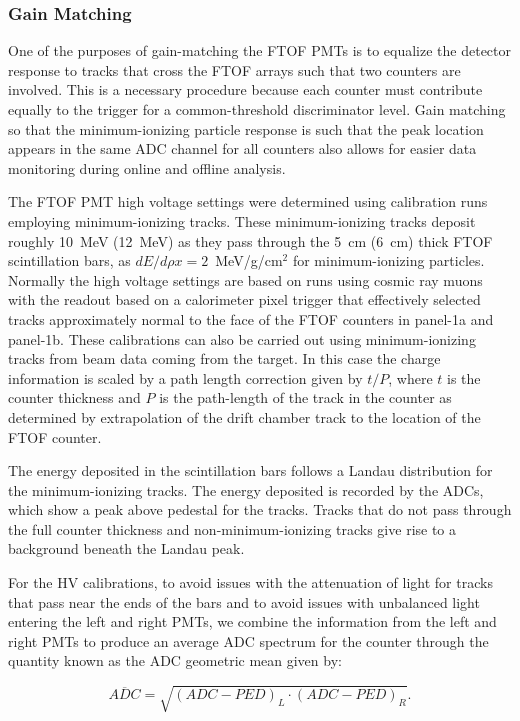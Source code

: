 \documentclass{elsart}
\begin{document}
\subsubsection{Gain Matching}
\label{gain-matching}

One of the purposes of gain-matching the FTOF PMTs is to equalize the detector response to tracks that
cross the FTOF arrays such that two counters are involved. This is a necessary procedure because each
counter must contribute equally to the trigger for a common-threshold discriminator level. Gain matching
so that the minimum-ionizing particle response is such that the peak location appears in the same ADC
channel for all counters also allows for easier data monitoring during online and offline analysis.

The FTOF PMT high voltage settings were determined using calibration runs employing minimum-ionizing tracks.
These minimum-ionizing tracks deposit roughly 10~MeV (12~MeV) as they pass through the 5~cm (6~cm) thick
FTOF scintillation bars, as $dE/d\rho x = 2$~MeV/g/cm$^2$ for minimum-ionizing particles. Normally the high
voltage settings are based on runs using cosmic ray muons with the readout based on a calorimeter pixel trigger
that effectively selected tracks approximately normal to the face of the FTOF counters in panel-1a and panel-1b.
These calibrations can also be carried out using minimum-ionizing tracks from beam data coming from the target.
In this case the charge information is scaled by a path length correction given by $t/P$, where $t$ is the counter
thickness and $P$ is the path-length of the track in the counter as determined by extrapolation of the drift
chamber track to the location of the FTOF counter.

The energy deposited in the scintillation bars follows a Landau distribution for the minimum-ionizing
tracks. The energy deposited is recorded by the ADCs, which show a peak above pedestal for the tracks. Tracks
that do not pass through the full counter thickness and non-minimum-ionizing tracks give rise to a background
beneath the Landau peak.

For the HV calibrations, to avoid issues with the attenuation of light for tracks that pass near the ends of the
bars and to avoid issues with unbalanced light entering the left and right PMTs, we combine the information
from the left and right PMTs to produce an average ADC spectrum for the counter through the quantity known
as the ADC geometric mean given by:

\begin{equation}
\label{adc}
\overline{ADC} = \sqrt{ (ADC - PED)_L \cdot (ADC - PED)_R}.
\end{equation}
\end{document}
